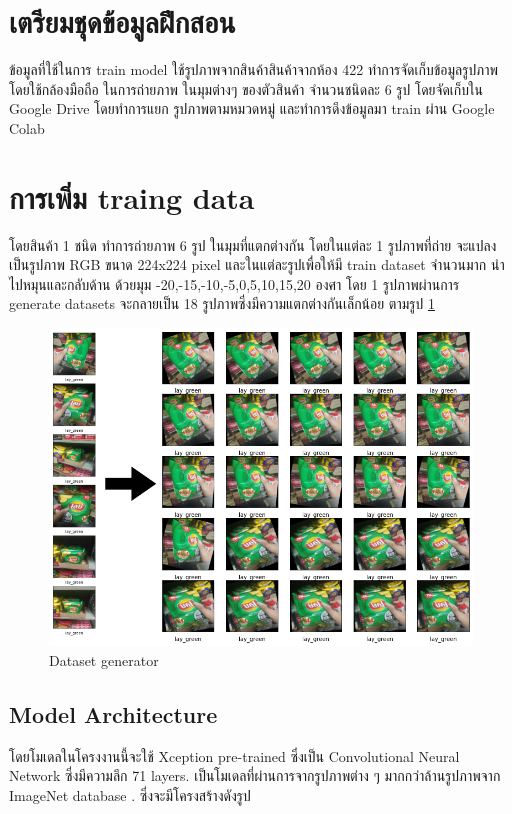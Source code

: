  

\section{เตรียมชุดข้อมูลฝึกสอน}
ข้อมูลที่ใช้ในการ train model ใช้รูปภาพจากสินค้าสินค้าจากห้อง 422  ทำการจัดเก็บข้อมูลรูปภาพ โดยใช้กล้องมือถือ ในการถ่ายภาพ ในมุมต่างๆ
ของตัวสินค้า จำนวนชนิดละ 6 รูป โดยจัดเก็บใน Google Drive โดยทำการแยก รูปภาพตามหมวดหมู่ และทำการดึงข้อมูลมา train ผ่าน Google Colab
 

\section{การเพิ่ม traing data}
โดยสินค้า 1 ชนิด ทำการถ่ายภาพ 6 รูป ในมุมที่แตกต่างกัน 
โดยในแต่ละ 1 รูปภาพที่ถ่าย จะแปลงเป็นรูปภาพ RGB ขนาด 224x224 pixel
และในแต่ละรูปเพื่อให้มี train dataset จำนวนมาก นำไปหมุนและกลับด้าน ด้วยมุม -20,-15,-10,-5,0,5,10,15,20 องศา
โดย 1 รูปภาพผ่านการ generate datasets จะกลายเป็น 18 รูปภาพซึ่งมีความแตกต่างกันเล็กน้อย ตามรูป \ref{fig:Dataset generator}
\begin{figure}[h]
  \begin{center}
  \includegraphics[scale=0.4]{pic/lay_genmore.png}
  \end{center}
  
  \caption[Dataset generator]{Dataset generator}
  \label{fig:Dataset generator}
  \end{figure}

  \newpage
\subsection{Model Architecture}
โดยโมเดลในโครงงานนี้จะใช้ Xception pre-trained ซึ่งเป็น Convolutional Neural Network ซึ่งมีความลึก 71 layers.
เป็นโมเดลที่ผ่านการจากรูปภาพต่าง ๆ มากกว่าล้านรูปภาพจาก ImageNet database .
ซึ่งจะมีโครงสร้างดังรูป


